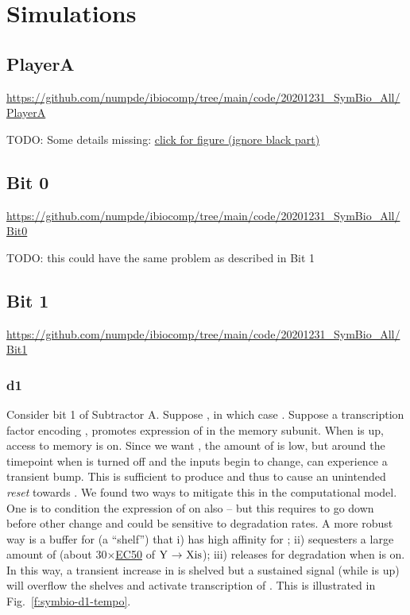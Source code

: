 \documentclass[12pt,notitlepage]{article}
\newcommand{\TODO}[1]{\textrm{\color{red}TODO: #1}}
\newcommand{\act}{\ {\ensuremath{\mathbin{\to}}}\ }
\begin{document}
%






\section{Simulations}

\subsection{PlayerA}

\url{https://github.com/numpde/ibiocomp/tree/main/code/20201231_SymBio_All/PlayerA}

\TODO{Some details missing:
\href{https://drive.google.com/file/d/1X1uEVNkUiXZqNz7C7m36YjW-g1XctIH0}{click for figure (ignore black part)}}

\subsection{Bit 0}

\url{https://github.com/numpde/ibiocomp/tree/main/code/20201231_SymBio_All/Bit0}

\TODO{this could have the same problem as described in Bit 1}

\subsection{Bit 1}

\url{https://github.com/numpde/ibiocomp/tree/main/code/20201231_SymBio_All/Bit1}

\subsubsection*{d1} \label{ss:d1}

Consider bit 1 of Subtractor A.
%
Suppose ,
in which case .
%
Suppose a transcription factor 
encoding ,
promotes expression of  in the memory subunit.
%
%
When  is up,
access to memory is on.
%
Since we want ,
the amount of  is low,
but
around the timepoint when 
 is turned off
and the inputs begin to change,
 can experience a transient bump.
%
This is sufficient to produce 
and thus to cause an unintended \emph{reset}
towards .
%
We found two ways to mitigate this
in the computational model.
%
One is to condition the expression of 
on  also
--
but this requires  to go down
before other change
and could be sensitive to degradation rates.
%
A more robust way
is a buffer for 
(a ``shelf'')
that 
%
i)
has high affinity for ;
%
ii)
sequesters 
a large amount of 
(about 30$\times$\href{https://en.wikipedia.org/wiki/EC50}{EC50} of $\ce{Y} \act \ce{Xis}$);
%
iii)
releases  for degradation when  is on.
%
In this way, 
a transient increase in  is shelved
but a sustained signal 
(while  is up)
will overflow the shelves and activate 
transcription of .
%
%
This is illustrated in Fig.~\ref{f:symbio-d1-tempo}.
\end{document}
